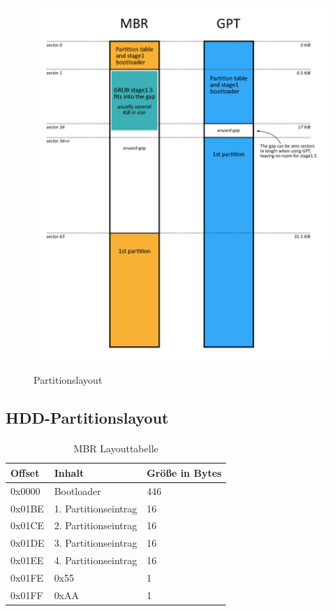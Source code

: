\documentclass[11pt,a4paper]{article}
\begin{document}
\begin{figure}[h!]
	\caption{Partitionslayout}
	\includegraphics[scale=0.78]{images/mbr_partition_layout.png}
	\label{fig:part_layout}
\end{figure}

\pagebreak{}

\subsection{HDD-Partitionslayout}
\paragraph{}

\begin{table}[h!]
	\begin{center}
		

		\begin{tabular}[c]{  l | l | l }
		\cellcolor{grey} Offset & \cellcolor{grey} Inhalt & \cellcolor{grey} Größe in Bytes \\ \hline
		0x0000 & Bootloader & 446\\ \hline
		0x01BE & 1. Partitionseintrag & 16 \\ \hline
		0x01CE & 2. Partitionseintrag & 16 \\ \hline
		0x01DE & 3. Partitionseintrag & 16 \\ \hline
		0x01EE & 4. Partitionseintrag & 16 \\ \hline
		0x01FE & 0x55 & 1\\ \hline
		0x01FF & 0xAA & 1\\
		\end{tabular}
	\end{center}
	
	\caption{MBR Layouttabelle}
	\label{tab:mbr_layout_tbl}
\end{table}
\end{document}
